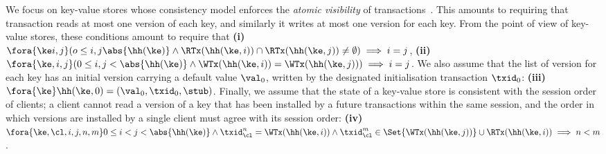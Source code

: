 We focus on key-value stores whose consistency model enforces the \emph{atomic visibility} of transactions~\cite{framework-concur}. 
This amounts to requiring that transaction reads at most one version of each key, and similarly 
it writes at most one version for each key. From the point of view of key-value stores, 
these conditions amount to require that \textbf{(i)}
$\fora{\ke i, j} (o \leq i, j \abs{ \hh(\ke) } \land \RTx(\hh(\ke, i)) \cap \RTx(\hh(\ke, j)) \neq \emptyset ) \implies i = j$, 
\textbf{(ii)}
$\fora{\ke, i, j} (0 \leq i,j < \abs{ \hh(\ke) } \wedge \WTx(\hh(\ke, i)) = \WTx(\hh(\ke, j)) ) \implies i = j$. 
We also assume that the list of version for each key has an initial version carrying a default value $\val_0$, 
written by the designated initialisation transaction $\txid_0$: \textbf{(iii)} $\fora{\ke} \hh(\ke, 0) = (\val_0, \txid_0, \stub)$.
Finally, we assume that the state of a key-value store is consistent with 
the session order of clients; a client cannot read a version of a key that has 
been installed by a future transactions within the same session, and 
the order in which versions are installed by a single client must agree 
with its session order: \textbf{(iv)}
$\fora{ \ke, \cl, i,j, n, m} 0 \leq i < j < \abs{\hh(\ke)} 
    \land \txid_{\cl}^{n} = \WTx(\hh(\ke,i)) {} \wedge \txid_{\cl}^{m} \in \Set{\WTx(\hh(\ke,j))} \cup \RTx(\hh(\ke, i))
    \implies n < m $.
%
%
